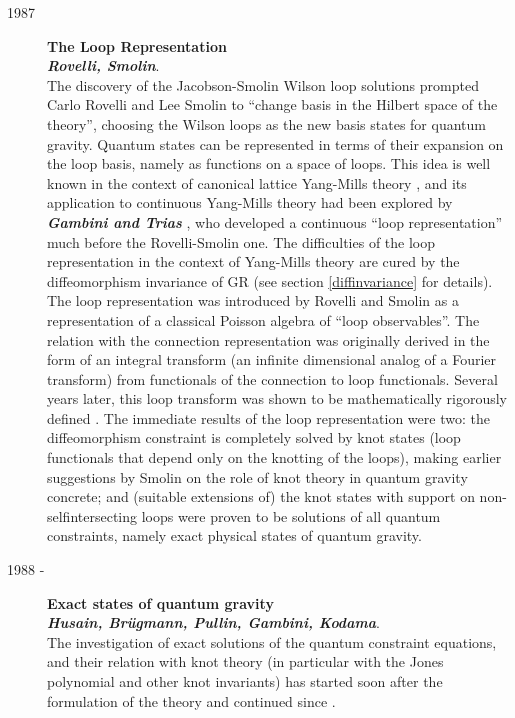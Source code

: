 \begin{description}
	\item[1987] {\bf  The Loop Representation\\ 
	{\em Rovelli, Smolin}}. \\
	The discovery of the Jacobson-Smolin Wilson loop solutions 
	prompted Carlo Rovelli and Lee Smolin 
	\cite{RovelliSmolin87,Rovelli88,RovelliSmolin88,RovelliSmolin90} 
	to ``change basis in the Hilbert space of the theory'', choosing 
	the Wilson loops as the new basis states for quantum gravity.  
	Quantum states can be represented in terms of their expansion on 
	the loop basis, namely as functions on a space of loops.  This 
	idea is well known in the context of canonical lattice Yang-Mills 
	theory \cite{WilsonKoguth}, and its application to continuous 
	Yang-Mills theory had been explored by \textbf{\em Gambini and 
	Trias} \cite{GambiniTrias2,GambiniTrias}, who developed a continuous 
	``loop representation'' much before the Rovelli-Smolin one.  The 
	difficulties of the loop representation in the context of 
	Yang-Mills theory are cured by the diffeomorphism invariance of GR 
	(see section \ref{diffinvariance} for details).  The loop 
	representation was introduced by Rovelli and Smolin as a 
	representation of a classical Poisson algebra of ``loop 
	observables''.  The relation with the connection representation 
	was originally derived in the form of an integral transform (an 
	infinite dimensional analog of a Fourier transform) from 
	functionals of the connection to loop functionals.  Several years 
	later, this loop transform was shown to be mathematically 
	rigorously defined \cite{AshtekarIsham}.  The immediate results of 
	the loop representation were two: the diffeomorphism constraint is 
	completely solved by knot states (loop functionals that depend 
	only on the knotting of the loops), making earlier suggestions by 
	Smolin on the role of knot theory in quantum gravity 
	\cite{Smolin88} concrete; and (suitable 
	\cite{RovelliSmolin90,Smolin93} extensions of) the knot states 
	with support on non-selfintersecting loops were proven to be 
	solutions of all quantum constraints, namely exact physical states 
	of quantum gravity.
	
	\item[1988 - ] {\bf Exact states of quantum gravity\\
	{\em Husain, Br\"ugmann, Pullin, Gambini, Kodama}}.\\
	The investigation of exact solutions of the quantum constraint 
	equations, and their relation with knot theory (in particular with 
	the Jones polynomial and other knot invariants) has started soon 
	after the formulation of the theory and continued since 
	\cite{H1,H5,H4,H6,H3,H7,H8,GambiniPullin,Kodama,PullinEtAl97}.


\end{description}
